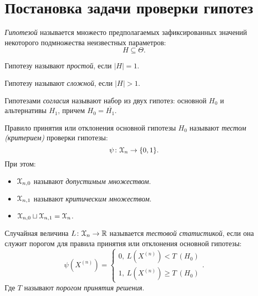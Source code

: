 \section{Постановка задачи проверки гипотез}

\begin{definition}
	\textit{Гипотезой} называется множесто предполагаемых зафиксированных значений
	некоторого подмножества неизвестных параметров:
	\[
		H \subseteq \Theta
	.\]
\end{definition}

\begin{definition}
	Гипотезу называют \textit{простой}, если $|H| = 1$.
\end{definition}

\begin{definition}
	Гипотезу называют \textit{сложной}, если $|H| > 1$.
\end{definition}

\begin{definition}
	Гипотезами \textit{согласия} называют набор из двух гипотез: основной $H_0$ и
	альтернативы $H_1$, причем $H_0 = \overline{H_1}$.
\end{definition}

\begin{definition}
	Правило принятия или отклонения основной гипотезы $H_0$ называют
	\textit{тестом (критерием)} проверки гипотезы:
	\[
		\psi \colon \mathcal{X}_{n} \to \{0, 1\}
	.\]
	При этом:
	\begin{itemize}
		\item $\mathcal{X}_{n, 0}$ называют \textit{допустимым множеством}.
		\item $\mathcal{X}_{n, 1}$ называют \textit{критическим множеством}.
		\item $\mathcal{X}_{n, 0} \sqcup \mathcal{X}_{n, 1} = \mathcal{X}_{n}$.
	\end{itemize}
\end{definition}

\begin{definition}
	Случайная величина $L\colon \mathcal{X}_n \to \mathbb{R}$ называется
	\textit{тестовой статистикой}, если она служит порогом для правила принятия
	или отклонения основной гипотезы:
	\[
        \psi(X^{(n)}) = \begin{cases}
            0,~ L(X^{(n)}) < T \> (H_0) \\
            1,~ L(X^{(n)}) \geqslant T \> (H_0)
		\end{cases}
	.\]
	Где $T$ называют \textit{порогом принятия решения}.
\end{definition}

